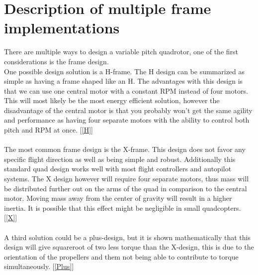\section{Description of multiple frame implementations}

There are multiple ways to design a variable pitch quadrotor, one of the first considerations is the frame design. 
\\
One possible design solution is a H-frame. The H design can be summarized as simple as having a frame shaped like an H. The advantages with this design is that we can use one central motor with a constant RPM instead of four motors. This will most likely be the most energy efficient solution, however the disadvantage of the central motor is that you probably won't  get the same agility and performance as having four separate motors with the ability to control both pitch and RPM at once. [\ref{H}]
\\\\
The most common frame design is the X-frame. This design does not favor any specific flight direction as well as being simple and robust. Additionally this standard quad design works well with most flight controllers and autopilot systems. The X design however will require four separate motors, thus mass will be distributed further out on the arms of the quad in comparison to the central motor. Moving mass away from the center of gravity will result in a higher inertia. It is possible that this effect might be negligible in small quadcopters. [\ref{X}]
\\\\
A third solution could be a plus-design, but it is shown mathematically that this design will give squareroot of two less torque than the X-design, this is due to the orientation of the propellers and them not being able to contribute to torque simultaneously. [\ref{Plus}]


